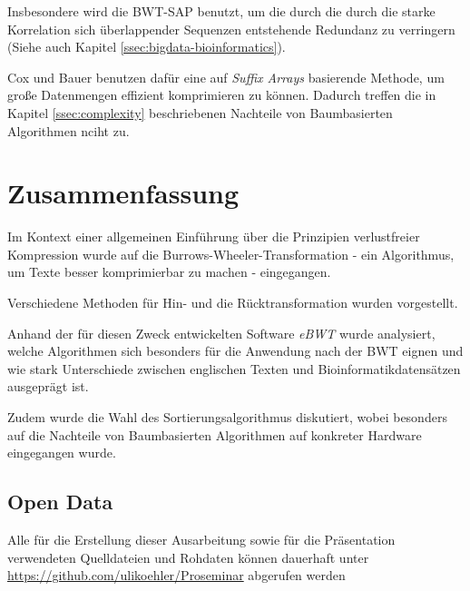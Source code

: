 \documentclass[ngerman,pdftex,paper=A4,DIV=calc,titlepage,12pt]{scrartcl}
\newtheorem[L]{boxedDefinition}{Definition}
\begin{document}
Insbesondere wird die BWT-SAP benutzt, um die durch die durch die starke Korrelation sich überlappender Sequenzen entstehende Redundanz zu verringern (Siehe auch Kapitel \vref{ssec:bigdata-bioinformatics}).

Cox und Bauer benutzen dafür eine auf \textit{Suffix Arrays} basierende Methode, um große Datenmengen effizient komprimieren zu können. Dadurch treffen die in Kapitel \vref{ssec:complexity} beschriebenen Nachteile von Baumbasierten Algorithmen nciht zu.
\section{Zusammenfassung}
Im Kontext einer allgemeinen Einführung über die Prinzipien verlustfreier Kompression wurde auf die Burrows-Wheeler-Transformation - ein Algorithmus, um Texte besser komprimierbar zu machen - eingegangen.

\noindent Verschiedene Methoden für Hin- und die Rücktransformation wurden vorgestellt. 

Anhand der für diesen Zweck entwickelten Software \textit{eBWT} wurde analysiert, welche Algorithmen sich besonders für die Anwendung nach der BWT eignen und wie stark Unterschiede zwischen englischen Texten und Bioinformatikdatensätzen ausgeprägt ist.

Zudem wurde die Wahl des Sortierungsalgorithmus diskutiert, wobei besonders auf die Nachteile von Baumbasierten Algorithmen auf konkreter Hardware eingegangen wurde.
\renewcommand\refname{Literatur- und Quellenverzeichnis}


\subsection*{Open Data}\label{opendata}
Alle für die Erstellung dieser Ausarbeitung sowie für die Präsentation verwendeten Quelldateien und Rohdaten können dauerhaft unter \url{https://github.com/ulikoehler/Proseminar} abgerufen werden
\end{document}
